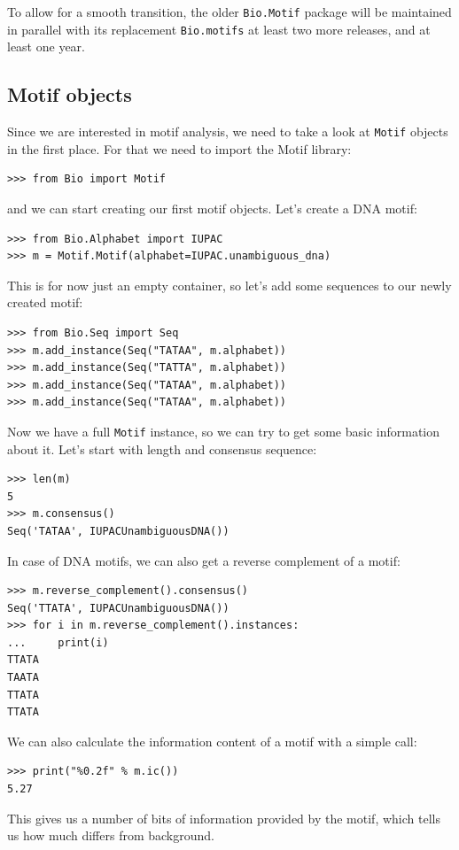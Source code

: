 \documentclass{report}
\begin{document}
To allow for a smooth transition, the older \verb|Bio.Motif| package will be
maintained in parallel with its replacement \verb|Bio.motifs| at least two more
releases, and at least one year.

\subsection{Motif objects}

Since we are interested in motif analysis, we need to take a look at
\verb|Motif| objects in the first place. For that we need to import 
the Motif library:
\begin{verbatim}
>>> from Bio import Motif
\end{verbatim}
and we can start creating our first motif objects. Let's create a DNA motif:
\begin{verbatim}
>>> from Bio.Alphabet import IUPAC
>>> m = Motif.Motif(alphabet=IUPAC.unambiguous_dna)
\end{verbatim}
This is for now just an empty container, so let's add some sequences to our newly created motif:
\begin{verbatim}
>>> from Bio.Seq import Seq
>>> m.add_instance(Seq("TATAA", m.alphabet))
>>> m.add_instance(Seq("TATTA", m.alphabet))
>>> m.add_instance(Seq("TATAA", m.alphabet))
>>> m.add_instance(Seq("TATAA", m.alphabet))
\end{verbatim}
Now we have a full \verb|Motif| instance, so we can try to get some
basic information about it. Let's start with length and consensus
sequence:
\begin{verbatim}
>>> len(m)
5
>>> m.consensus()
Seq('TATAA', IUPACUnambiguousDNA())
\end{verbatim}
In case of DNA motifs, we can also get a reverse complement of a motif:
\begin{verbatim}
>>> m.reverse_complement().consensus()
Seq('TTATA', IUPACUnambiguousDNA())
>>> for i in m.reverse_complement().instances:
...     print(i)
TTATA
TAATA
TTATA
TTATA
\end{verbatim}

We can also calculate the information content of a motif with a simple call:
\begin{verbatim}
>>> print("%0.2f" % m.ic())
5.27
\end{verbatim}
This gives us a number of bits of information provided by the motif,
which tells us how much differs from background.
\end{document}
